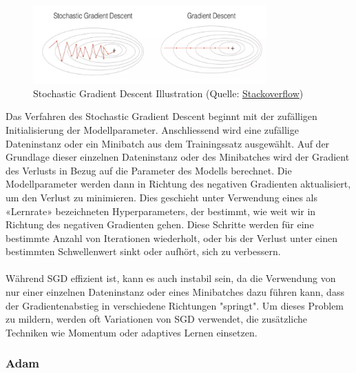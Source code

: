 \documentclass{article}
\begin{document}
\begin{figure}[!h]
    \centering
    \includegraphics[width=0.8\textwidth]{images/sgd.png}
    \caption{\label{fig:resnet_50_architecture}Stochastic Gradient Descent Illustration (Quelle: \href{https://stackoverflow.com/questions/69251109/fluctuations-of-gradient-descent}{Stackoverflow})}
\end{figure}


Das Verfahren des Stochastic Gradient Descent beginnt mit der zufälligen Initialisierung der Modellparameter. Anschliessend wird eine zufällige Dateninstanz oder ein Minibatch aus dem Trainingssatz ausgewählt. Auf der Grundlage dieser einzelnen Dateninstanz oder des Minibatches wird der Gradient des Verlusts in Bezug auf die Parameter des Modells berechnet. Die Modellparameter werden dann in Richtung des negativen Gradienten aktualisiert, um den Verlust zu minimieren. Dies geschieht unter Verwendung eines als «Lernrate» bezeichneten Hyperparameters, der bestimmt, wie weit wir in Richtung des negativen Gradienten gehen. Diese Schritte werden für eine bestimmte Anzahl von Iterationen wiederholt, oder bis der Verlust unter einen bestimmten Schwellenwert sinkt oder aufhört, sich zu verbessern.\\\\
Während SGD effizient ist, kann es auch instabil sein, da die Verwendung von nur einer einzelnen Dateninstanz oder eines Minibatches dazu führen kann, dass der Gradientenabstieg in verschiedene Richtungen "springt". Um dieses Problem zu mildern, werden oft Variationen von SGD verwendet, die zusätzliche Techniken wie Momentum oder adaptives Lernen einsetzen.

\subsubsection{Adam}
\end{document}
